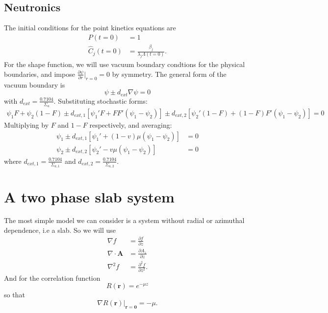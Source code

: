 \documentclass[12pt]{article}
\begin{document}
\subsection{Neutronics}
The initial conditions for the point kinetics equations are
\begin{align}
    P(t=0)&=1 \\
    \hat{C}_j(t=0)&=\frac{\beta_j}{\lambda_j \Lambda(t=0)}.
\end{align}
For the shape function, we will use vacuum boundary condtions for the physical boundaries, and impose $\frac{\partial \psi}{\partial r}|_{r=0}=0$ by symmetry. The general form of the vacuum boundary is 
\begin{equation}
    \psi \pm d_{ext}\nabla \psi = 0
\end{equation}
with $d_{ext}=\frac{0.7104}{\Sigma_a}$. Substituting stochastic forms:
\begin{align}
    \psi_1 F +\psi_2 (1-F) \pm d_{ext,1}[\psi_1 'F +FF'(\psi_1 -\psi_2)]\pm d_{ext,2}[\psi_2 '(1-F)+(1-F)F'(\psi_1 -\psi_2)]=0
\end{align}
Multiplying by $F$ and $1-F$ respectively, and averaging:
\begin{align}
    \psi_1 \pm d_{ext,1}[\psi_1'+(1-v)\mu (\psi_1 -\psi_2)]&=0 \\
    \psi_2 \pm d_{ext,2}[\psi_2'-v\mu (\psi_1 -\psi_2)]&=0
\end{align}
where $d_{ext,1}=\frac{0.7104}{\Sigma_{a,1}}$ and $d_{ext,2}=\frac{0.7104}{\Sigma_{a,2}}$.

\section{A two phase slab system}
The most simple model we can consider is a system without radial or azimuthal dependence, i.e a slab. So we will use 
\begin{align}
    \nabla f &= \frac{\partial f}{\partial z}  \\
    \nabla \cdot \mathbf{A} &=\frac{\partial A_z}{\partial z} \\
    \nabla ^2 f&=\frac{\partial ^2 f}{\partial z^2}.
\end{align}
And for the correlation function 
\begin{equation}
    R(\mathbf{r})=e^{-\mu z}
\end{equation}
so that 
\begin{equation}
    \nabla  R(\mathbf{r}) |_{\mathbf{r}=\mathbf{0}}= -\mu.
\end{equation}
\end{document}
